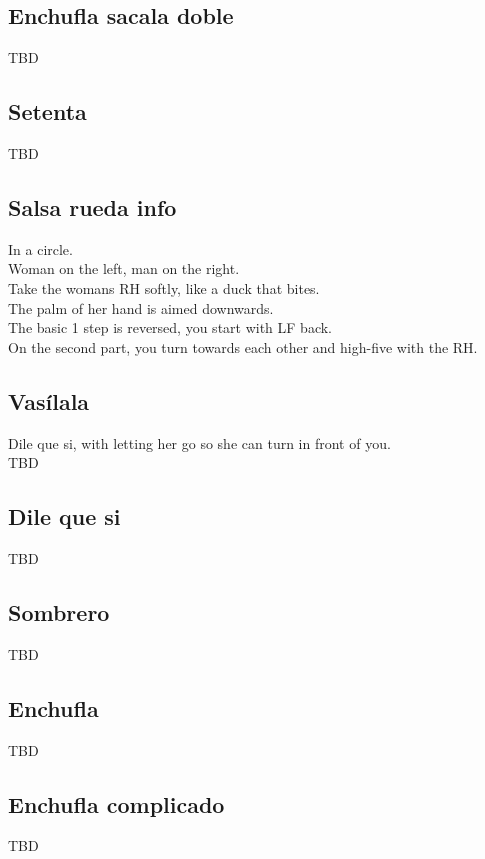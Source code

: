 \subsection{Enchufla sacala doble}
TBD

\subsection{Setenta}
TBD

\subsection{Salsa rueda info}
In a circle.\\
Woman on the left, man on the right.\\
Take the womans RH softly, like a duck that bites.\\
The palm of her hand is aimed downwards.\\
The basic 1 step is reversed, you start with LF back.\\
On the second part, you turn towards each other and high-five with the RH.

\subsection{Vas\'{i}lala}
Dile que si, with letting her go so she can turn in front of you.\\
TBD

\subsection{Dile que si}
TBD

\subsection{Sombrero}
TBD

\subsection{Enchufla}
TBD

\subsection{Enchufla complicado}
TBD
